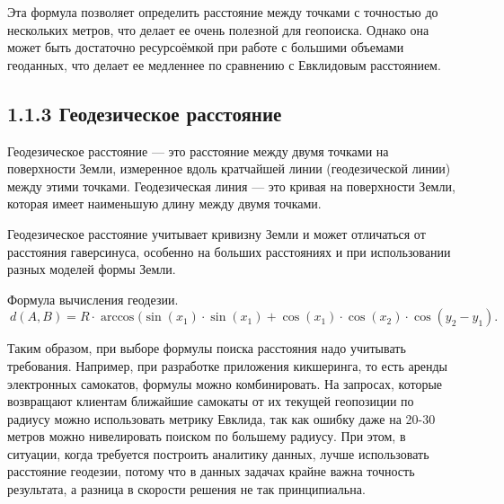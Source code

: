 Эта формула позволяет определить расстояние между точками с точностью до нескольких метров, что делает ее очень полезной для геопоиска. Однако она может быть достаточно ресурсоёмкой при работе с большими объемами геоданных, что делает ее медленнее по сравнению с Евклидовым расстоянием. 

\subsection{1.1.3 Геодезическое расстояние}
Геодезическое расстояние — это расстояние между двумя точками на поверхности Земли, измеренное вдоль кратчайшей линии (геодезической линии) между этими точками. Геодезическая линия — это кривая на поверхности Земли, которая имеет наименьшую длину между двумя точками.

Геодезическое расстояние учитывает кривизну Земли и может отличаться от расстояния гаверсинуса, особенно на больших расстояниях и при использовании разных моделей формы Земли.

Формула вычисления геодезии.
\begin{equation} \label{eq}
\ d(A, B) = R \cdot \arccos(\sin(x_1) \cdot \sin(x_1) + \cos(x_1) \cdot \cos(x_2) \cdot \cos(y_2 - y_1).
\end{equation}
\par
Таким образом, при выборе формулы поиска расстояния надо учитывать требования. Например, при разработке приложения кикшеринга, то есть аренды электронных самокатов, формулы можно комбинировать. На запросах, которые возвращают клиентам ближайшие самокаты от их текущей геопозиции по радиусу можно использовать метрику Евклида, так как ошибку даже на 20-30 метров можно нивелировать поиском по большему радиусу.  
При этом, в ситуации, когда требуется построить аналитику данных, лучше использовать расстояние геодезии, потому что в данных задачах крайне важна точность результата, а разница в скорости решения не так принципиальна. 
